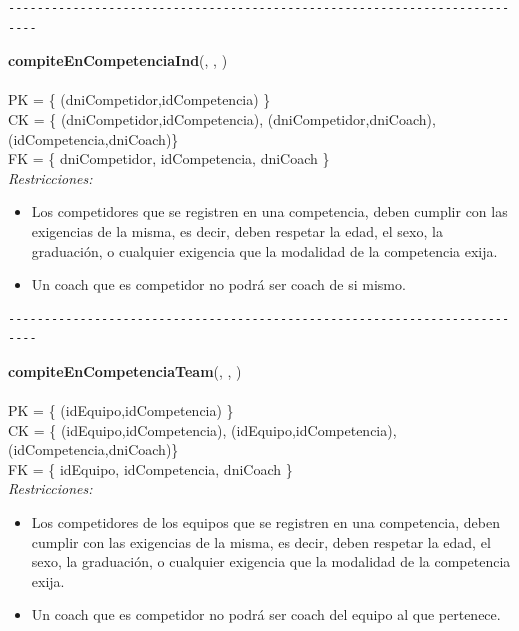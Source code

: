 \begin{verbatim}
--------------------------------------------------------------------------
\end{verbatim}

\noindent\textbf{compiteEnCompetenciaInd}(, , )
\\
\\
PK = \{ (dniCompetidor,idCompetencia) \} \\
CK = \{ (dniCompetidor,idCompetencia), (dniCompetidor,dniCoach), (idCompetencia,dniCoach)\} \\
FK = \{ dniCompetidor, idCompetencia, dniCoach \} \\

\textit{Restricciones:}
\begin{itemize}
	\item Los competidores que se registren en una competencia, deben cumplir con las exigencias de la misma, es decir, deben respetar la edad, el sexo, la graduación, o cualquier exigencia que la modalidad de la competencia exija.
	\item Un coach que es competidor no podrá ser coach de si mismo.
\end{itemize}


\begin{verbatim}
--------------------------------------------------------------------------
\end{verbatim}

\noindent\textbf{compiteEnCompetenciaTeam}(, , )
\\
\\
PK = \{ (idEquipo,idCompetencia) \} \\
CK = \{ (idEquipo,idCompetencia), (idEquipo,idCompetencia), (idCompetencia,dniCoach)\} \\
FK = \{ idEquipo, idCompetencia, dniCoach \} \\

\textit{Restricciones:}
\begin{itemize}
	\item Los competidores de los equipos que se registren en una competencia, deben cumplir con las exigencias de la misma, es decir, deben respetar la edad, el sexo, la graduación, o cualquier exigencia que la modalidad de la competencia exija.
	\item Un coach que es competidor no podrá ser coach del equipo al que pertenece.
\end{itemize}

